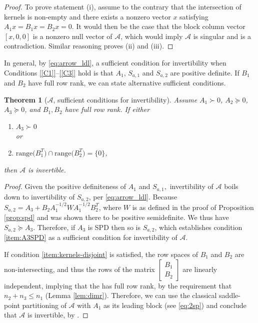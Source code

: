 \documentclass{article}
\newtheorem{theorem}{Theorem}
\newcommand{\spsd}{\succeq 0}
\newcommand{\spd}{\succ 0}
\newcommand{\range}{\mathrm{range}}
\newcommand{\sA}{\mathcal{A}}
\begin{document}
\begin{proof}
    To prove statement (i), assume to the contrary that  the intersection of kernels is non-empty and there exists a nonzero vector $x$ satisfying $A_1 x = B_1 x = B_2 x = 0$. It would then be the case that the block column vector $[x, 0, 0]$ is a nonzero null vector of $\sA$, which would imply $\sA$ is singular and is a contradiction. Similar reasoning proves (ii) and (iii).
\end{proof}

In general, by \eqref{eq:arrow_ldl}, a sufficient condition for invertibility when Conditions \ref{[C1]}--\ref{[C3]} hold is that $A_1$, $S_{a,1}$ and $S_{a,2}$ are positive definite. If $B_1$ and $B_2$ have full row rank, we can state  alternative sufficient conditions.

\begin{theorem}[$\sA$, sufficient conditions for invertibility]
\label{thm:invertibility-suff-arrow}
Assume $A_1\spd$, $A_2\spsd$, $A_3\spsd$, and $B_1,B_2$ have full row rank. If either
\begin{enumerate}[label={(\roman*)}]
  \item \label{item:A3SPD} $A_3\spd$ \\ 
   or
  \item \label{item:kernels-disjoint} $\range\big(B_1^T\big) \cap \range\big( B_2^T\big) = \{0\}$,
\end{enumerate}
then  $\sA$ is invertible. 
\end{theorem}

\begin{proof}
Given the positive definiteness of $A_1$ and $S_{a,1},$ invertibility of $\sA$ boils down to invertibility of $S_{a,2}$, per \eqref{eq:arrow_ldl}. Because $S_{a,2} = A_3 + B_2 A_1^{-1/2}WA_1^{-1/2}B_2^T$, where $W$ is as defined in the proof of Proposition \ref{prop:spd} and was shown there to be positive semidefinite. We thus have $S_{a,2} \succeq A_3$. Therefore, if $A_3$ is SPD then so is $S_{a,2}$, which establishes condition \ref{item:A3SPD} as a sufficient condition for invertibility of $\sA$.

If condition \ref{item:kernels-disjoint} is satisfied, the row spaces of $B_1$ and $B_2$ are non-intersecting, and thus the rows of the matrix $\begin{bmatrix} B_1 \\ B_2 \end{bmatrix}$ are linearly independent, implying that the has full row rank, by the requirement that $n_2 + n_3 \le n_1$ (Lemma \ref{lem:dimr}). Therefore, we can use the classical saddle-point partitioning of $\sA$ with $A_1$ as its leading block (see \eqref{eq:2sp}) and conclude that $\sA$ is invertible, by \cite[Theorem 3.1]{bgl05}.
\end{proof}
\end{document}
